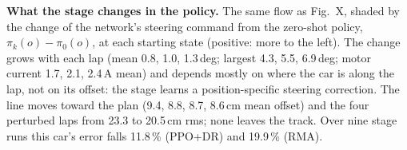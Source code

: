 \caption{\textbf{What the stage changes in the policy.} The same flow as Fig.~X, shaded by the change of the network's steering command
from the zero-shot policy, $\pi_k(o) - \pi_0(o)$, at each starting state (positive: more to the left). The change grows with each lap
(mean 0.8, 1.0, 1.3\,deg; largest 4.3, 5.5, 6.9\,deg; motor current 1.7, 2.1, 2.4\,A mean) and depends mostly on where the car is along
the lap, not on its offset: the stage learns a position-specific steering correction. The line moves toward the plan (9.4, 8.8, 8.7,
8.6\,cm mean offset) and the four perturbed laps from 23.3 to 20.5\,cm rms; none leaves the track. Over nine stage runs this car's error
falls 11.8\,\% (PPO+DR) and 19.9\,\% (RMA).}
